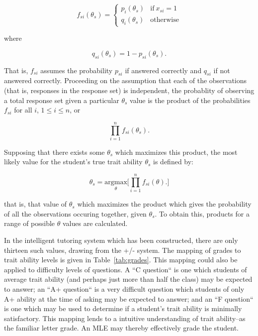 \begin{equation}
f_{si}(\theta_s) =\left\{
         \begin{array}{ll}
               p_i(\theta_s) & \mathrm{if}\  x_{si} = 1 \\
               q_i(\theta_s) & \mathrm{otherwise}
         \end{array}
       \right.
\end{equation}

where 

\begin{equation}
   q_{si}(\theta_s)  = 1 - p_{si}(\theta_s).
\end{equation}

That is, $f_{si}$ assumes the probability $p_{si}$ if answered correctly and
$q_{si}$ if not answered correctly.  Proceeding on the assumption that each of
the observations (that is, responses in the response set) is independent, the
probablity of observing a total response set given a particular $\theta_s$
value is the product of the probabilities $f_{si}$ for all $i$, $1 \leq i \leq
n$, or

\begin{equation}
  \prod_{i=1}^n f_{si}(\theta_s).
\end{equation}

Supposing that there exists some $\theta_s$ which maximizes this product,
the most likely value for the student's true trait ability $\theta_s$ is
defined by:

\begin{equation}
  \theta_s = 
  \underset{\theta}{\textrm{argmax}}
  \Bigg[ 
  \prod_{i=1}^n f_{si}(\theta).
  \Bigg]
\end{equation}

that is, that value of $\theta_s$ which maximizes the product which gives the
probability of all the observations occuring together, given $\theta_s$.  To
obtain this, products for a range of possible $\theta$ values are calculated.

In the intelligent tutoring system which has been constructed, there are only
thirteen such values, drawing from the +/- system.  The mapping of grades to
trait ability levels is given in Table~\ref{tab:grades}.  This mapping could
also be applied to difficulty levels of questions.  A ``C question`` is one
which students of average trait ability (and perhaps just more than half the
class) may be expected to answer; an ``A+ question`` is a very difficult
question which students of only A+ ability at the time of asking may be
expected to answer; and an ``F question`` is one which may be used to determine
if a student's trait ability is minimally satisfactory.  This mapping lends to
a intuitive understanding of trait ability--as the familiar letter grade.  An
MLE may thereby effectively grade the student.

